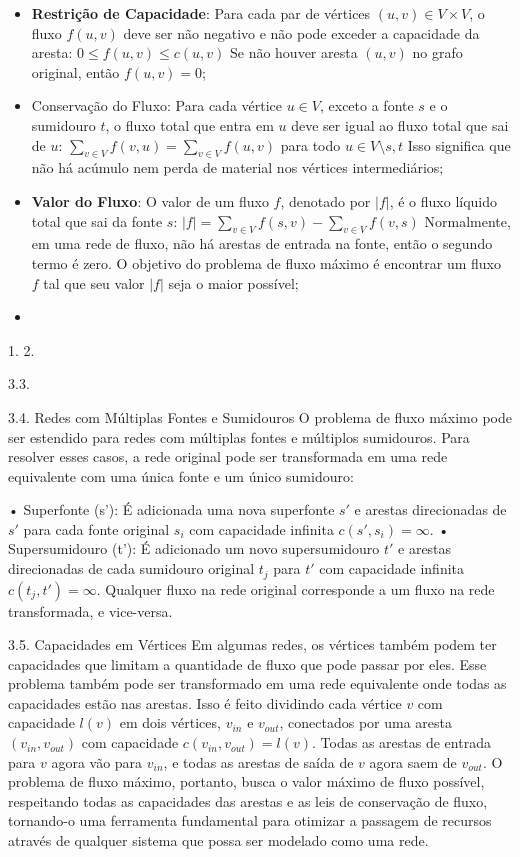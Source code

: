 \documentclass[12pt]{article}
\begin{document}
\begin{itemize}
    \item \textbf{Restrição de Capacidade}: Para cada par de vértices $(u, v) \in V \times V$, o fluxo $f(u, v)$ deve ser não negativo e não pode exceder a capacidade da aresta: $0 \le f(u, v) \le c(u, v)$ Se não houver aresta $(u, v)$ no grafo original, então $f(u, v) = 0$;
    \item Conservação do Fluxo: Para cada vértice $u \in V$, exceto a fonte $s$ e o sumidouro $t$, o fluxo total que entra em $u$ deve ser igual ao fluxo total que sai de $u$: $\sum_{v \in V} f(v, u) = \sum_{v \in V} f(u, v)$ para todo $u \in V \setminus {s, t}$ Isso significa que não há acúmulo nem perda de material nos vértices intermediários;
    \item \textbf{Valor do Fluxo}: O valor de um fluxo $f$, denotado por $|f|$, é o fluxo líquido total que sai da fonte $s$: $|f| = \sum_{v \in V} f(s, v) - \sum_{v \in V} f(v, s)$ Normalmente, em uma rede de fluxo, não há arestas de entrada na fonte, então o segundo termo é zero. O objetivo do problema de fluxo máximo é encontrar um fluxo $f$ tal que seu valor $|f|$ seja o maior possível;
    \item 
\end{itemize}
1. 
2. 

3.3. 

3.4. Redes com Múltiplas Fontes e Sumidouros O problema de fluxo máximo pode ser estendido para redes com múltiplas fontes e múltiplos sumidouros. Para resolver esses casos, a rede original pode ser transformada em uma rede equivalente com uma única fonte e um único sumidouro:

• Superfonte (s’): É adicionada uma nova superfonte $s'$ e arestas direcionadas de $s'$ para cada fonte original $s_i$ com capacidade infinita $c(s', s_i) = \infty$.
• Supersumidouro (t’): É adicionado um novo supersumidouro $t'$ e arestas direcionadas de cada sumidouro original $t_j$ para $t'$ com capacidade infinita $c(t_j, t') = \infty$. Qualquer fluxo na rede original corresponde a um fluxo na rede transformada, e vice-versa.

3.5. Capacidades em Vértices Em algumas redes, os vértices também podem ter capacidades que limitam a quantidade de fluxo que pode passar por eles. Esse problema também pode ser transformado em uma rede equivalente onde todas as capacidades estão nas arestas. Isso é feito dividindo cada vértice $v$ com capacidade $l(v)$ em dois vértices, $v_{in}$ e $v_{out}$, conectados por uma aresta $(v_{in}, v_{out})$ com capacidade $c(v_{in}, v_{out}) = l(v)$. Todas as arestas de entrada para $v$ agora vão para $v_{in}$, e todas as arestas de saída de $v$ agora saem de $v_{out}$.
O problema de fluxo máximo, portanto, busca o valor máximo de fluxo possível, respeitando todas as capacidades das arestas e as leis de conservação de fluxo, tornando-o uma ferramenta fundamental para otimizar a passagem de recursos através de qualquer sistema que possa ser modelado como uma rede.
\end{document}
